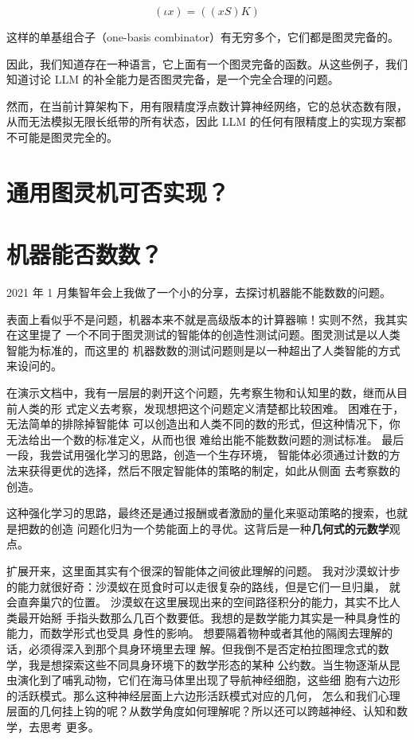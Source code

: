 \documentclass[a4paper,12pt]{article}
\numberwithin{problem}{section}
\numberwithin{definition}{section}
\numberwithin{lemma}{section}
\numberwithin{proposition}{section}
\numberwithin{theorem}{section}
\numberwithin{grammar}{section}
\numberwithin{program}{section}
\numberwithin{convention}{section}
\numberwithin{corollary}{section}
\begin{document}
$$
(\iota x) = ((x S) K)
$$

这样的单基组合子（one-basis combinator）有无穷多个，它们都是图灵完备的。

因此，我们知道存在一种语言，它上面有一个图灵完备的函数。从这些例子，我们知道讨论 LLM 的补全能力是否图灵完备，是一个完全合理的问题。

然而，在当前计算架构下，用有限精度浮点数计算神经网络，它的总状态数有限，从而无法模拟无限长纸带的所有状态，因此 LLM 的任何有限精度上的实现方案都不可能是图灵完全的。

\section{通用图灵机可否实现？}



\section{机器能否数数？}

2021 年 1 月集智年会上我做了一个小的分享，去探讨机器能不能数数的问题。

表面上看似乎不是问题，机器本来不就是高级版本的计算器嘛！实则不然，我其实在这里提了
一个不同于图灵测试的智能体的创造性测试问题。图灵测试是以人类智能为标准的，而这里的
机器数数的测试问题则是以一种超出了人类智能的方式来设问的。

在演示文档中，我有一层层的剥开这个问题，先考察生物和认知里的数，继而从目前人类的形
式定义去考察，发现想把这个问题定义清楚都比较困难。 困难在于，无法简单的排除掉智能体
可以创造出和人类不同的数的形式，但这种情况下，你无法给出一个数的标准定义，从而也很
难给出能不能数数问题的测试标准。 最后一段，我尝试用强化学习的思路，创造一个生存环境，
智能体必须通过计数的方法来获得更优的选择，然后不限定智能体的策略的制定，如此从侧面
去考察数的创造。

这种强化学习的思路，最终还是通过报酬或者激励的量化来驱动策略的搜索，也就是把数的创造
问题化归为一个势能面上的寻优。这背后是一种\textbf{几何式的元数学}观点。

扩展开来，这里面其实有个很深的智能体之间彼此理解的问题。
我对沙漠蚁计步的能力就很好奇：沙漠蚁在觅食时可以走很复杂的路线，但是它们一旦归巢，
就会直奔巢穴的位置。 沙漠蚁在这里展现出来的空间路径积分的能力，其实不比人类最开始掰
手指头数那么几百个数要低。我想的是数学能力其实是一种具身性的能力，而数学形式也受具
身性的影响。 想要隔着物种或者其他的隔阂去理解的话，必须得深入到那个具身环境里去理
解。但我倒不是否定柏拉图理念式的数学，我是想探索这些不同具身环境下的数学形态的某种
公约数。当生物逐渐从昆虫演化到了哺乳动物，它们在海马体里出现了导航神经细胞，这些细
胞有六边形的活跃模式。那么这种神经层面上六边形活跃模式对应的几何， 怎么和我们心理
层面的几何挂上钩的呢？从数学角度如何理解呢？所以还可以跨越神经、认知和数学，去思考
更多。
\end{document}
